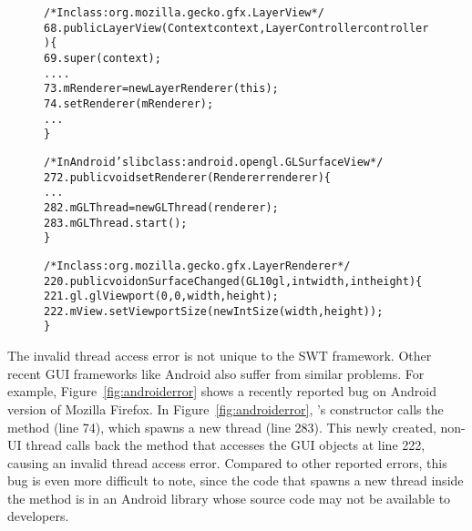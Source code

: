 \begin{figure}[t]
\begin{CodeOut}
\begin{alltt}

     /* In class: org.mozilla.gecko.gfx.LayerView */
68.  public LayerView(Context context, LayerController controller) \{
69.     super(context);
        ....
73.     mRenderer = new LayerRenderer(this);
74.     setRenderer(mRenderer);
        ...
     \}

     /* In Android's lib class: android.opengl.GLSurfaceView */
272. public void setRenderer(Renderer renderer) \{
        ...
282.    mGLThread = new GLThread(renderer);
283.    mGLThread.start();   
     \}

     /* In class: org.mozilla.gecko.gfx.LayerRenderer */
220. public void onSurfaceChanged(GL10 gl, int width, int height) \{
221.    gl.glViewport(0, 0, width, height);
222.    mView.setViewportSize(new IntSize(width, height));
     \}

\end{alltt}
\end{CodeOut}
\vspace*{-2.0ex}  %
\end{figure}

The invalid thread access error is not unique to the SWT framework. Other recent GUI frameworks
like Android also suffer from similar problems. For example, 
Figure~\ref{fig:androiderror} shows a recently reported bug on Android version of Mozilla Firefox.
In Figure~\ref{fig:androiderror}, 's constructor calls the
 method (line 74), which spawns a new thread (line 283).
This newly created, non-UI thread calls back the  method that
accesses the GUI objects at line 222, causing an invalid thread access error.
Compared to other reported errors, this bug is even more difficult to note, 
since the code that spawns a new thread inside the  method is
in an Android library whose source code may not be available to developers.

